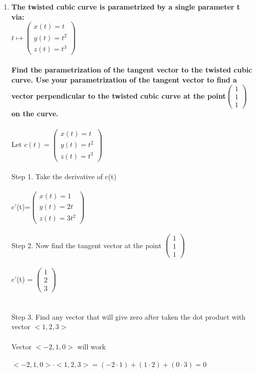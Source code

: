 \documentclass{article}
\begin{document}
\begin{enumerate}[6.]
	\item\textbf{The twisted cubic curve is parametrized by a single parameter t via:\\$t\mapsto\left(\!\begin{array}{c}x(t) = t \\ y(t)=t^{2} \\  z(t)=t^{3}\end{array} \!\right)$\\\\Find the parametrization of the tangent vector to the twisted cubic curve. Use your parametrization of the tangent vector to find a vector perpendicular to the twisted cubic curve at the point$\left(\!\begin{array}{c}1 \\ 1 \\  1\end{array} \!\right)$ on the curve.}
	\\
	\\
	Let $c(t)=\left(\!\begin{array}{c}x(t) = t \\ y(t)=t^{2} \\  z(t)=t^{3}\end{array} \!\right)$
	\\
	\\
	Step 1. Take the derivative of c(t)\\
	\\
	c'(t)=$\left(\!\begin{array}{c}x(t) = 1 \\ y(t)= 2t \\  z(t)=3t^{2}\end{array} \!\right)$\\
	\\
	Step 2. Now find the tangent vector at the point $\left(\!\begin{array}{c}1 \\ 1 \\  1\end{array} \!\right)$\\
	\\
	c'(t) = $\left(\!\begin{array}{c} 1 \\ 2 \\  3\end{array} \!\right)$\\
	\\
	\\
	Step 3. Find any vector that will give zero after taken the dot product with vector $<1,2,3>$\\
	\\
	Vector $<-2,1,0>$ will work \\
	\\
	$<-2,1,0>\cdot<1,2,3>=(-2\cdot1)+(1\cdot2)+(0\cdot3)=0$ 
\end{enumerate}
\end{document}
